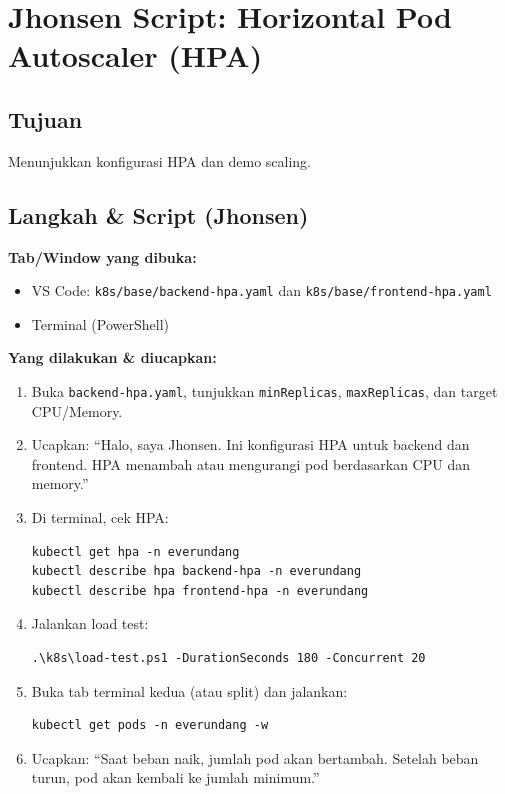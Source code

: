 \documentclass[11pt,a4paper]{article}
\begin{document}
\section{Jhonsen Script: Horizontal Pod Autoscaler (HPA)}
\subsection*{Tujuan}
Menunjukkan konfigurasi HPA dan demo scaling.

\subsection*{Langkah \& Script (Jhonsen)}
\textbf{Tab/Window yang dibuka:}
\begin{itemize}
  \item VS Code: \texttt{k8s/base/backend-hpa.yaml} dan \texttt{k8s/base/frontend-hpa.yaml}
  \item Terminal (PowerShell)
\end{itemize}

\textbf{Yang dilakukan \& diucapkan:}
\begin{enumerate}
  \item Buka \texttt{backend-hpa.yaml}, tunjukkan \texttt{minReplicas}, \texttt{maxReplicas}, dan target CPU/Memory.
  \item Ucapkan:
  “Halo, saya Jhonsen. Ini konfigurasi HPA untuk backend dan frontend. HPA menambah atau mengurangi pod berdasarkan CPU dan memory.”

  \item Di terminal, cek HPA:
\begin{lstlisting}
kubectl get hpa -n everundang
kubectl describe hpa backend-hpa -n everundang
kubectl describe hpa frontend-hpa -n everundang
\end{lstlisting}

  \item Jalankan load test:
\begin{lstlisting}
.\k8s\load-test.ps1 -DurationSeconds 180 -Concurrent 20
\end{lstlisting}

  \item Buka tab terminal kedua (atau split) dan jalankan:
\begin{lstlisting}
kubectl get pods -n everundang -w
\end{lstlisting}

  \item Ucapkan:
  “Saat beban naik, jumlah pod akan bertambah. Setelah beban turun, pod akan kembali ke jumlah minimum.”
\end{enumerate}
\end{document}
